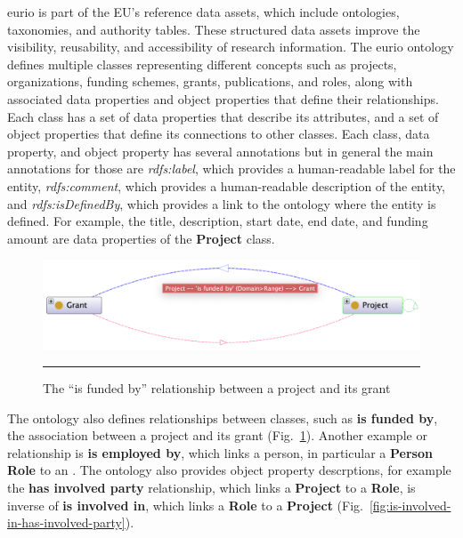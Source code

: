 \gls{eurio} is part of the EU's reference data assets, which include ontologies, taxonomies, and authority tables.
These structured data assets improve the visibility, reusability, and accessibility of research information.
The \gls{eurio} ontology defines multiple classes representing different concepts such as projects, organizations, funding schemes, grants, publications, and roles, along with associated data properties and object properties that define their relationships.
Each class has a set of data properties that describe its attributes, and a set of object properties that define its connections to other classes.
Each class, data property, and object property has several annotations but in general the main annotations for those are \textit{rdfs:label}, which provides a human-readable label for the entity, \textit{rdfs:comment}, which provides a human-readable description of the entity, and \textit{rdfs:isDefinedBy}, which provides a link to the ontology where the entity is defined.
For example, the title, description, start date, end date, and funding amount are data properties of the \textbf{Project} class.

\begin{figure}[htbp]
    \centering
 \includegraphics[width=.9\textwidth]{figures/architecture/is-funded-by.png}
     \rule{35em}{0.5pt}
    \caption{The ``is funded by'' relationship between a project and its grant}
 \label{fig:is-funded-by}
\end{figure}

The ontology also defines relationships between classes, such as \textbf{is funded by}, the association between a project and its grant (Fig.~\ref{fig:is-funded-by}).
Another example or relationship is \textbf{is employed by}, which links a person, in particular a \textbf{Person Role} to an .
The ontology also provides object property descrptions, for example the \textbf{has involved party} relationship, which links a \textbf{Project} to a \textbf{Role}, is inverse of \textbf{is involved in}, which links a \textbf{Role} to a \textbf{Project} (Fig.~\ref{fig:is-involved-in-has-involved-party}).

